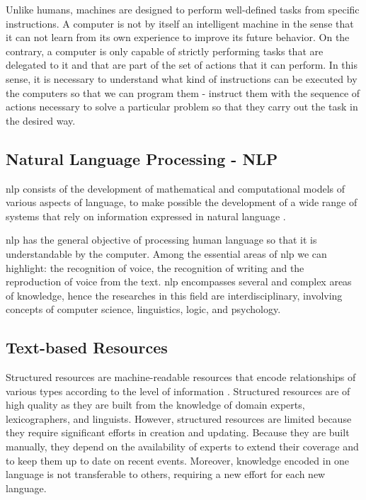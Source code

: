 Unlike humans, machines are designed to perform well-defined tasks from specific instructions. A computer is not by itself an intelligent machine in the sense that it can not learn from its own experience to improve its future behavior. On the contrary, a computer is only capable of strictly performing tasks that are delegated to it and that are part of the set of actions that it can perform. In this sense, it is necessary to understand what kind of instructions can be executed by the computers so that we can program them - instruct them with the sequence of actions necessary to solve a particular problem so that they carry out the task in the desired way.
\subsection{\hspace*{3pt}Natural Language Processing - NLP}

 

\gls{nlp} consists of the development of mathematical and computational models of various aspects of language, to make possible the development of a wide range of systems that rely on information expressed in natural language \cite{joshi1991natural}.


\gls{nlp} has the general objective of processing human language so that it is understandable by the computer. Among the essential areas of \gls{nlp} we can highlight: the recognition of voice, the recognition of writing and the reproduction of voice from the text. \gls{nlp} encompasses several and complex areas of knowledge, hence the  researches in this field are interdisciplinary, involving concepts of computer science, linguistics, logic, and psychology.


\subsection{\hspace*{3pt}Text-based Resources}
Structured resources are machine-readable resources that encode relationships of various types according to the level of information \cite{hovy2013collaboratively}. Structured resources are of high quality as they are built from the knowledge of domain experts, lexicographers, and linguists. However, structured resources are limited because they require significant efforts in creation and updating. Because they are built manually, they depend on the availability of experts to extend their coverage and to keep them up to date on recent events. Moreover, knowledge encoded in one language is not transferable to others, requiring a new effort for each new language.

